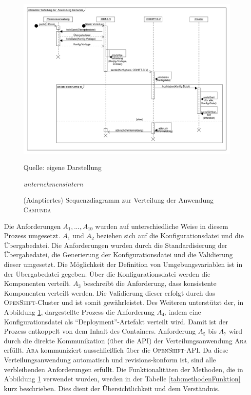 \begin{figure}[h!]
	\centering
	\includegraphics[scale=0.39]{img/prozessDeploymentCamunda.pdf}
	\caption{(Adaptiertes) Sequenzdiagramm zur Verteilung der Anwendung \textsc{Camunda}}
	{\footnotesize Quelle: eigene Darstellung \par \textit{unternehmensintern}}
	\label{abb:prozessDeploymentCamunda}
\end{figure}
Die Anforderungen $A_{1}, ..., A_{10}$ wurden auf unterschiedliche Weise in diesem Prozess umgesetzt. $A_{1}$ und $A_{2}$ beziehen sich auf die Konfigurationsdatei und die Übergabedatei. Die Anforderungen wurden durch die Standardisierung der Übergabedatei, die Generierung der Konfigurationsdatei und die Validierung dieser umgesetzt. Die Möglichkeit der Definition von Umgebungsvariablen ist in der Übergabedatei gegeben. Über die Konfigurationsdatei werden die Komponenten verteilt. $A_{3}$ beschreibt die Anforderung, dass konsistente Komponenten verteilt werden. Die Validierung dieser erfolgt durch das \textsc{OpenShift}-Cluster und ist somit gewährleistet. Des Weiteren unterstützt der, in Abbildung \ref{abb:prozessDeploymentCamunda}, dargestellte Prozess die Anforderung $A_{4}$, indem eine Konfigurationsdatei als \enquote{Deployment}-Artefakt verteilt wird. Damit ist der Prozess entkoppelt von dem Inhalt des Containers. Anforderung $A_{5}$ bis $A_{7}$ wird durch die direkte Kommunikation (über die \ac{API}) der Verteilungsanwendung \textsc{Ara} erfüllt. \textsc{Ara} kommuniziert ausschließlich über die \textsc{OpenShift}-\ac{API}. Da diese Verteilungsanwendung automatisch und revisions-konform ist, sind alle verbleibenden Anforderungen erfüllt. Die Funktionalitäten der Methoden, die in Abbildung \ref{abb:prozessDeploymentCamunda} verwendet wurden, werden in der Tabelle \ref{tab:methodenFunktion} kurz beschrieben. Dies dient der Übersichtlichkeit und dem Verständnis. 


